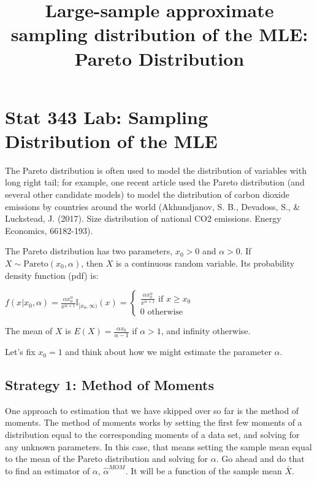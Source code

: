 \documentclass[]{article}
\title{Large-sample approximate sampling distribution of the MLE: Pareto
Distribution}
\author{}
\date{}
\begin{document}
\maketitle

\def\simiid{\stackrel{{\mbox{\text{\tiny i.i.d.}}}}{\sim}}

\section{Stat 343 Lab: Sampling Distribution of the
MLE}\label{stat-343-lab-sampling-distribution-of-the-mle}

The Pareto distribution is often used to model the distribution of
variables with long right tail; for example, one recent article used the
Pareto distribution (and several other candidate models) to model the
distribution of carbon dioxide emissions by countries around the world
(Akhundjanov, S. B., Devadoss, S., \& Luckstead, J. (2017). Size
distribution of national CO2 emissions. Energy Economics, 66182-193).

The Pareto distribution has two parameters, \(x_0 > 0\) and
\(\alpha > 0\). If \(X \sim \text{Pareto}(x_0, \alpha)\), then \(X\) is
a continuous random variable. Its probability density function (pdf) is:

\(f(x | x_0, \alpha) = \frac{\alpha x_0^\alpha}{x^{\alpha + 1}}\mathbb{I}_{[x_0, \infty)}(x) = \begin{cases} \frac{\alpha x_0^\alpha}{x^{\alpha + 1}} \text{ if $x \geq x_0$} \\ 0 \text{ otherwise} \end{cases}\)

The mean of \(X\) is \(E(X) = \frac{\alpha x_0}{\alpha - 1}\) if
\(\alpha > 1\), and infinity otherwise.

Let's fix \(x_0 = 1\) and think about how we might estimate the
parameter \(\alpha\).

\subsection{Strategy 1: Method of
Moments}\label{strategy-1-method-of-moments}

One approach to estimation that we have skipped over so far is the
method of moments. The method of moments works by setting the first few
moments of a distribution equal to the corresponding moments of a data
set, and solving for any unknown parameters. In this case, that means
setting the sample mean equal to the mean of the Pareto distribution and
solving for \(\alpha\). Go ahead and do that to find an estimator of
\(\alpha\), \(\hat{\alpha}^{MOM}\). It will be a function of the sample
mean \(\bar{X}\).
\end{document}
